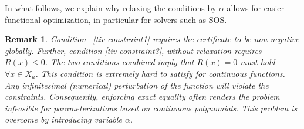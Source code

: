 \documentclass[journal,twoside,web]{ieeecolor}
\newcommand{\ml}[1]{{\color{blue}[ML: #1]}}
\theoremstyle{definition}
\theoremstyle{plain}
\theoremstyle{plain}
\newtheorem{remark}{Remark}
\begin{document}

In what follows, we explain why relaxing the conditions by $\alpha$ allows for easier functional optimization, in particular for solvers such as SOS.

\begin{remark}
    \label{rem:alpha}
    Condition~ \ref{tiv-constraint1} requires the certificate to be non-negative globally. Further, condition \ref{tiv-constraint3}, without relaxation  requires $R(x) \leq 0$. The two conditions combined imply that $R(x) = 0$ must hold $\forall x \in X_u$. This condition is extremely hard to satisfy for continuous functions. Any infinitesimal (numerical) perturbation of the function will violate the constraints. Consequently, enforcing exact equality often renders the problem infeasible for parameterizations based on continuous polynomials. This problem is overcome by introducing variable $\alpha$. 
\end{remark}

\end{document}
